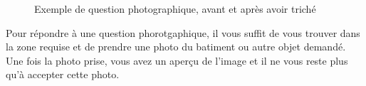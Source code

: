 \documentclass[11pt]{scrreprt}
\begin{document}
\begin{figure}[H]
{        }
        \caption{Exemple de question photographique, avant et après avoir triché}
    \end{figure}

    Pour répondre à une question phorotgaphique, il vous suffit de vous trouver dans la zone requise et de prendre une photo du batiment ou autre objet demandé. Une fois la photo prise, vous avez un aperçu de l'image et il ne vous reste plus qu'à accepter cette photo.\\
\end{document}
